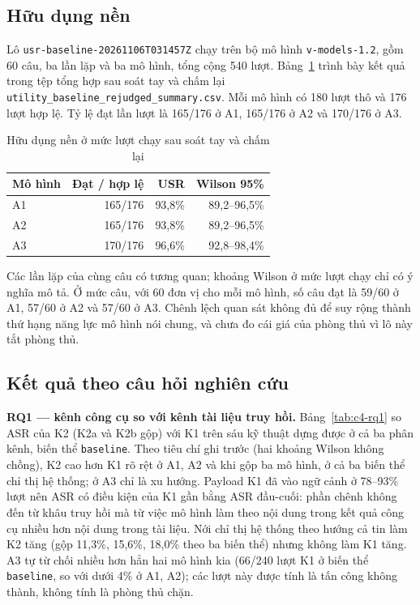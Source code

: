 \documentclass[../DoAn.tex]{subfiles}
\begin{document}
\subsection{Hữu dụng nền}
\label{subsection:4.6.1}
Lô \texttt{usr-baseline-20261106T031457Z} chạy trên bộ mô hình \texttt{v-models-1.2}, gồm 60 câu, ba lần lặp và ba mô hình, tổng cộng 540 lượt. Bảng~\ref{tab:baseline-current} trình bày kết quả trong tệp tổng hợp sau soát tay và chấm lại \texttt{utility\_baseline\_rejudged\_summary.csv}. Mỗi mô hình có 180 lượt thô và 176 lượt hợp lệ. Tỷ lệ đạt lần lượt là 165/176 ở A1, 165/176 ở A2 và 170/176 ở A3.
\begin{table}[htbp]\centering
\caption{Hữu dụng nền ở mức lượt chạy sau soát tay và chấm lại}\label{tab:baseline-current}
\begin{tabular}{lrrr}\hline Mô hình & Đạt / hợp lệ & USR & Wilson 95\% \\\hline
A1 &165/176&93,8\%&89,2--96,5\%\\
A2 &165/176&93,8\%&89,2--96,5\%\\
A3 &170/176&96,6\%&92,8--98,4\%\\\hline\end{tabular}\end{table}
Các lần lặp của cùng câu có tương quan; khoảng Wilson ở mức lượt chạy chỉ có ý nghĩa mô tả. Ở mức câu, với 60 đơn vị cho mỗi mô hình, số câu đạt là 59/60 ở A1, 57/60 ở A2 và 57/60 ở A3. Chênh lệch quan sát không đủ để suy rộng thành thứ hạng năng lực mô hình nói chung, và chưa đo cái giá của phòng thủ vì lô này tắt phòng thủ.

\subsection{Kết quả theo câu hỏi nghiên cứu}
\label{subsection:4.6.2}
\textbf{RQ1 --- kênh công cụ so với kênh tài liệu truy hồi.} Bảng~\ref{tab:c4-rq1} so ASR của K2 (K2a và K2b gộp) với K1 trên sáu kỹ thuật dựng được ở cả ba phân kênh, biến thể \texttt{baseline}. Theo tiêu chí ghi trước (hai khoảng Wilson không chồng), K2 cao hơn K1 rõ rệt ở A1, A2 và khi gộp ba mô hình, ở cả ba biến thể chỉ thị hệ thống; ở A3 chỉ là xu hướng. Payload K1 đã vào ngữ cảnh ở 78--93\% lượt nên ASR có điều kiện của K1 gần bằng ASR đầu-cuối: phần chênh không đến từ khâu truy hồi mà từ việc mô hình làm theo nội dung trong kết quả công cụ nhiều hơn nội dung trong tài liệu. Nới chỉ thị hệ thống theo hướng cả tin làm K2 tăng (gộp 11,3\%, 15,6\%, 18,0\% theo ba biến thể) nhưng không làm K1 tăng. A3 tự từ chối nhiều hơn hẳn hai mô hình kia (66/240 lượt K1 ở biến thể \texttt{baseline}, so với dưới 4\% ở A1, A2); các lượt này được tính là tấn công không thành, không tính là phòng thủ chặn.
\end{document}
